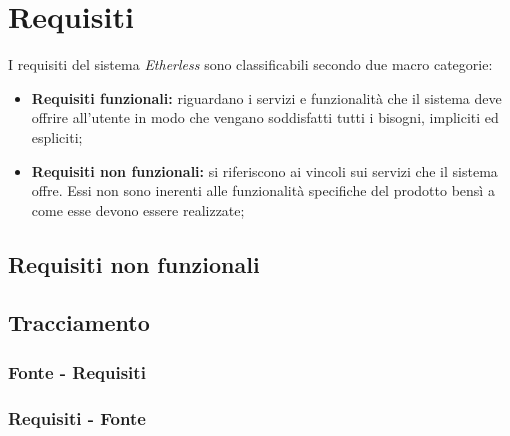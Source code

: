 \section{Requisiti}
I requisiti del sistema \textit{Etherless} sono classificabili secondo due macro categorie:
\begin{itemize}
	\item \textbf{Requisiti funzionali:} riguardano i servizi e funzionalità che il sistema deve offrire all'utente in modo che vengano soddisfatti tutti i bisogni, impliciti ed espliciti;
	\item \textbf{Requisiti non funzionali:} si riferiscono ai vincoli sui servizi che il sistema offre. Essi non sono inerenti alle funzionalità specifiche del prodotto bensì a come esse devono essere realizzate;
\end{itemize}


\newpage
\subsection{Requisiti non funzionali}

\newpage


\newpage
\subsection{Tracciamento}

\subsubsection{Fonte - Requisiti}
\subsubsection{Requisiti - Fonte}
